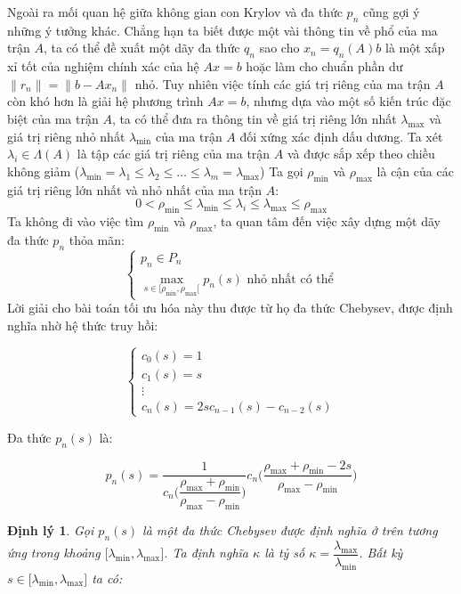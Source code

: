 \documentclass[14pt, a4paper]{article}
\numberwithin{equation}{section}
\numberwithin{algorithm}{section}
\numberwithin{figure}{section}
\newtheorem{dl}{Định lý}
\numberwithin{dl}{section}
\numberwithin{md}{section}
\numberwithin{bd}{section}
\numberwithin{dn}{section}
\begin{document}
\begin{enumerate}[a)]
    Ngoài ra mối quan hệ giữa không gian con Krylov và đa thức $p_n$ cũng gợi ý những ý tưởng khác. Chẳng hạn ta biết được một vài thông tin về phổ của ma trận $A$, ta có thể đề xuất một dãy đa thức $q_n$ sao cho $x_n = q_n(A)b$ là một xấp xỉ tốt của nghiệm chính xác của hệ $Ax=b$ hoặc làm cho chuẩn phần dư $\lVert r_n \rVert = \lVert b - Ax_n \rVert$ nhỏ.
    Tuy nhiên việc tính các giá trị riêng của ma trận $A$ còn khó hơn là giải hệ phương trình $Ax=b$, nhưng dựa vào một số kiến trúc đặc biệt của ma trận $A$, ta có thể đưa ra thông tin về giá trị riêng lớn nhất $\lambda_{\max}$ và giá trị riêng nhỏ nhất $\lambda_{\min}$ của ma trận $A$ đối xứng xác định dấu dương. Ta xét $\lambda_i \in \Lambda(A)$ là tập các giá trị riêng của ma trận $A$ và được sắp xếp theo chiều không giảm ($\lambda_{\min}=\lambda_1 \leq \lambda_2 \leq \dots \leq \lambda_m = \lambda_{\max}$)
    Ta gọi $\rho_{\min}$ và $\rho_{\max}$ là cận của các giá trị riêng lớn nhất và nhỏ nhất của ma trận $A$:
    \begin{equation}
        0 < \rho_{\min} \leq \lambda_{\min} \leq \lambda_i \leq \lambda_{\max} \leq \rho_{\max}
    \end{equation}
    Ta không đi vào việc tìm $\rho_{\min}$ và $\rho_{\max}$, ta quan tâm đến việc xây dựng một dãy đa thức $p_n$ thỏa mãn:
    \begin{equation}
        \begin{cases} p_n \in P_n \\ \underset{s \in \lbrack \rho_{\min}, \rho_{\max} \lbrack }{\max} p_n(s) \text{ nhỏ nhất có thể} \end{cases}
    \end{equation}
    Lời giải cho bài toán tối ưu hóa này thu được từ họ đa thức Chebysev, được định nghĩa nhờ hệ thức truy hồi:

    \begin{equation}
        \begin{cases} c_0(s)=1 \\ c_1(s)=s \\ \vdots \\ c_n(s)=2sc_{n-1}(s) - c_{n-2}(s) \end{cases}
    \end{equation}

    Đa thức $p_n(s)$ là:

    \begin{equation}
        p_n(s) = \dfrac{1}{c_n\Big(\dfrac{\rho_{\max} + \rho_{\min}}{\rho_{\max} - \rho_{\min}}\Big)}c_n \Big( \dfrac{\rho_{\max} + \rho_{\min} - 2s}{\rho_{\max} - \rho_{\min}} \Big)
    \end{equation}
    \begin{dl}
        Gọi $p_n(s)$ là một đa thức Chebysev được định nghĩa ở trên tương ứng trong khoảng $\lbrack \lambda_{\min}, \lambda_{\max} \rbrack$. Ta định nghĩa $\kappa$ là tỷ số $\kappa=\dfrac{\lambda_{\max}}{\lambda_{\min}}$. Bất kỳ $s \in \lbrack \lambda_{\min}, \lambda_{\max} \rbrack$ ta có:


\end{dl}
\end{enumerate}
\end{document}
